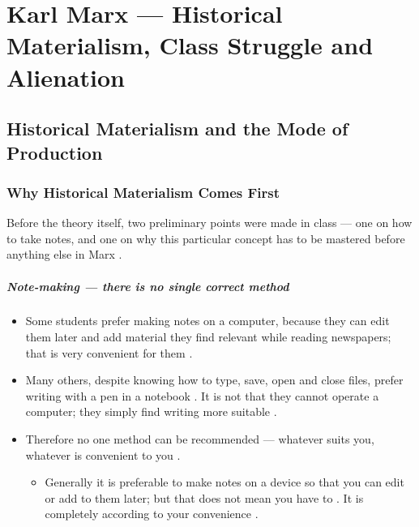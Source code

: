 
\chapter{Karl Marx --- Historical Materialism, Class Struggle and Alienation}

\section{Historical Materialism and the Mode of Production}

\subsection{Why Historical Materialism Comes First}
Before the theory itself, two preliminary points were made in class --- one on how to take notes, and one on why this particular concept has to be mastered before anything else in Marx .

\paragraph{Note-making --- there is no single correct method}
\begin{itemize}
    \item Some students prefer making notes on a computer, because they can edit them later and add material they find relevant while reading newspapers; that is very convenient for them .
    \item Many others, despite knowing how to type, save, open and close files, prefer writing with a pen in a notebook . It is not that they cannot operate a computer; they simply find writing more suitable .
    \item Therefore no one method can be recommended --- whatever suits you, whatever is convenient to you .
    \begin{itemize}
        \item Generally it is preferable to make notes on a device so that you can edit or add to them later; but that does not mean you have to . It is completely according to your convenience .
    \end{itemize}
\end{itemize}

